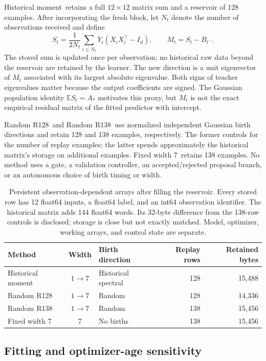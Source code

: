 \documentclass[10pt]{article}
\newcommand{\Hmethod}{Historical moment}
\newcommand{\Rsmall}{Random R128}
\newcommand{\Rlarge}{Random R138}
\newcommand{\Fmethod}{Fixed width 7}
\begin{document}
\Hmethod\ retains a full $12\times12$ matrix sum and a reservoir of
128 examples. After incorporating the fresh block, let $N_t$ denote
the number of observations received and define
\begin{equation}
 S_t=\frac{1}{2N_t}\sum_{i\le N_t}Y_i(X_iX_i^\top-I_d),\qquad
 M_t=S_t-B_{t^-}.
 \label{eq:moment-proposal}
\end{equation}
The stored sum is updated once per observation; no historical raw
data beyond the reservoir are retained by the learner. The new
direction is a unit eigenvector of $M_t$ associated with its largest
absolute eigenvalue. Both signs of teacher eigenvalues matter because
the output coefficients are signed. The Gaussian population identity
$\mathbb E S_t=A_*$ motivates this proxy, but $M_t$ is not the exact
empirical residual matrix of the fitted predictor with intercept.

\Rsmall\ and \Rlarge\ use normalized independent Gaussian birth
directions and retain 128 and 138 examples, respectively. The former
controls for the number of replay examples; the latter spends
approximately the historical matrix's storage on additional examples.
\Fmethod\ retains 138 examples. No method uses a gate, a validation
controller, an accepted/rejected proposal branch, or an autonomous
choice of birth timing or width.

\begin{table}[t]
\centering\small
\begin{tabular}{lclrr}
\toprule
Method & Width & Birth direction & Replay rows & Retained bytes\\
\midrule
\Hmethod & $1\to7$ & Historical spectral & 128 & 15,488\\
\Rsmall & $1\to7$ & Random & 128 & 14,336\\
\Rlarge & $1\to7$ & Random & 138 & 15,456\\
\Fmethod & 7 & No births & 138 & 15,456\\
\bottomrule
\end{tabular}
\caption{Persistent observation-dependent arrays after filling the
reservoir. Every stored row has 12 float64 inputs, a float64 label,
and an int64 observation identifier. The historical matrix adds
144 float64 words. Its 32-byte difference from the 138-row controls
is disclosed; storage is close but not exactly matched. Model,
optimizer, working arrays, and control state are separate.}
\label{tab:methods}
\end{table}

\subsection{Fitting and optimizer-age sensitivity}
\end{document}
